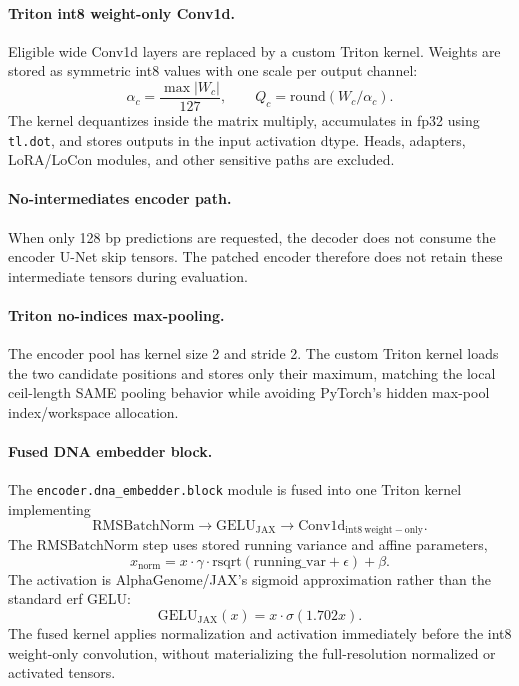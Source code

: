 \documentclass[11pt]{article}
\begin{document}
\paragraph{Triton int8 weight-only Conv1d.}
Eligible wide Conv1d layers are replaced by a custom Triton kernel. Weights are
stored as symmetric int8 values with one scale per output channel:
\[
  \alpha_c = \frac{\max |W_c|}{127}, \qquad
  Q_c = \mathrm{round}(W_c / \alpha_c).
\]
The kernel dequantizes inside the matrix multiply, accumulates in fp32 using
\texttt{tl.dot}, and stores outputs in the input activation dtype. Heads,
adapters, LoRA/LoCon modules, and other sensitive paths are excluded.

\paragraph{No-intermediates encoder path.}
When only 128 bp predictions are requested, the decoder does not consume the
encoder U-Net skip tensors. The patched encoder therefore does not retain these
intermediate tensors during evaluation.

\paragraph{Triton no-indices max-pooling.}
The encoder pool has kernel size 2 and stride 2. The custom Triton kernel loads
the two candidate positions and stores only their maximum, matching the local
ceil-length SAME pooling behavior while avoiding PyTorch's hidden max-pool
index/workspace allocation.

\paragraph{Fused DNA embedder block.}
The \texttt{encoder.dna\_embedder.block} module is fused into one Triton kernel
implementing
\[
  \mathrm{RMSBatchNorm} \rightarrow \mathrm{GELU}_{\mathrm{JAX}}
  \rightarrow \mathrm{Conv1d}_{\mathrm{int8~weight-only}}.
\]
The RMSBatchNorm step uses stored running variance and affine parameters,
\[
  x_{\mathrm{norm}} =
  x \cdot \gamma \cdot \mathrm{rsqrt}(\mathrm{running\_var} + \epsilon) + \beta.
\]
The activation is AlphaGenome/JAX's sigmoid approximation rather than the
standard erf GELU:
\[
  \mathrm{GELU}_{\mathrm{JAX}}(x) = x \cdot \sigma(1.702x).
\]
The fused kernel applies normalization and activation immediately before the
int8 weight-only convolution, without materializing the full-resolution
normalized or activated tensors.
\end{document}
